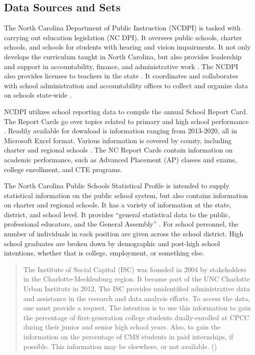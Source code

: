 \subsection{Data Sources and Sets}
The North Carolina Department of Public Instruction (NCDPI) is tasked with carrying out education legislation (NC DPI). It oversees public schools, charter schools, and schools for students with hearing and vision impairments. 
It not only develops the curriculum taught in North Carolina, but also provides leadership and support in accountability, finance, and administrative work \parencite[][]{NCDPI}.
The NCDPI also provides licenses to teachers in the state \parencite[][]{NCDPI}. It coordinates and collaborates with school administration and accountability offices to collect and organize data on schools state-wide \parencite[][]{NCDPI}.

NCDPI utilizes school reporting data to compile the annual School Report Card. The Report Cards go over topics related to primary and high school performance \parencite[][]{NCReportCards}.
Readily available for download is information ranging from 2013-2020, all in Microsoft Excel format. Various information is covered by county, including charter and regional schools \parencite[][]{NCReportCards}. 
The NC Report Cards contain information on academic performance, such as Advanced Placement (AP) classes and exams, college enrollment, and CTE programs\parencite[][]{NCReportCards}.

The North Carolina Public Schools Statistical Profile is intended to supply statistical information on the public school system, but also contains information on charter and regional schools\parencite[][]{NCStats}. 
It has a variety of information at the state, district, and school level\parencite[][]{NCStats}.
It provides “general statistical data to the public, professional educators, and the General Assembly” \parencite[][]{NCStats}. 
For school personnel, the number of individuals in each position are given across the school district. High school graduates are broken down by demographic and post-high school intentions, whether that is college, employment, or something else\parencite[][]{NCStats}.

\blockquote{The Institute of Social Capital (ISC) was founded in 2004 by stakeholders in the Charlotte-Mecklenburg region. It became part of the UNC Charlotte Urban Institute in 2012. 
The ISC provides unidentified administrative data and assistance in the research and data analysis efforts. To access the data, one must provide a request. 
The intention is to use this information to gain the percentage of first-generation college students dually-enrolled at CPCC during their junior and senior high school years. 
Also, to gain the information on the percentage of CMS students in paid internships, if possible. This information may be elsewhere, or not available. (\cite{team1a})}

